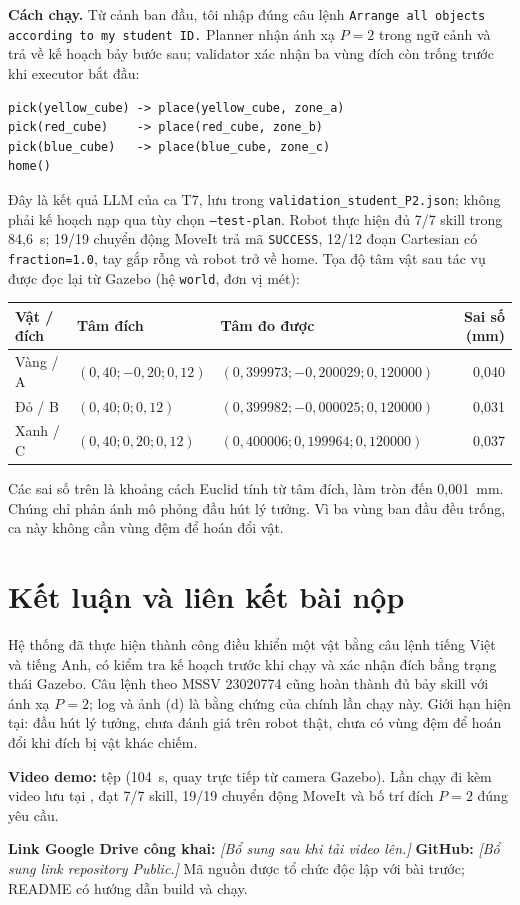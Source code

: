 \documentclass[11pt,a4paper]{article}
\begin{document}
\textbf{Cách chạy.} Từ cảnh ban đầu, tôi nhập đúng câu lệnh
\texttt{Arrange all objects according to my student ID.} Planner nhận ánh xạ
$P=2$ trong ngữ cảnh và trả về kế hoạch bảy bước sau; validator xác nhận ba
vùng đích còn trống trước khi executor bắt đầu:
\begin{lstlisting}
pick(yellow_cube) -> place(yellow_cube, zone_a)
pick(red_cube)    -> place(red_cube, zone_b)
pick(blue_cube)   -> place(blue_cube, zone_c)
home()
\end{lstlisting}
Đây là kết quả LLM của ca T7, lưu trong
\texttt{validation\_student\_P2.json}; không phải kế hoạch nạp qua tùy chọn
\texttt{--test-plan}. Robot thực hiện đủ 7/7 skill trong
84,6~s; 19/19 chuyển động MoveIt trả mã \texttt{SUCCESS}, 12/12 đoạn Cartesian
có \texttt{fraction=1.0}, tay gắp rỗng và robot trở về home. Tọa độ tâm vật
sau tác vụ được đọc lại từ Gazebo (hệ \texttt{world}, đơn vị mét):
\begin{center}\small
\begin{tabular}{@{}lllr@{}}
\toprule\textbf{Vật / đích} & \textbf{Tâm đích} & \textbf{Tâm đo được} & \textbf{Sai số (mm)}\\\midrule
Vàng / A & $(0{,}40;-0{,}20;0{,}12)$ & $(0{,}399973;-0{,}200029;0{,}120000)$ & 0,040\\
Đỏ / B & $(0{,}40;0;0{,}12)$ & $(0{,}399982;-0{,}000025;0{,}120000)$ & 0,031\\
Xanh / C & $(0{,}40;0{,}20;0{,}12)$ & $(0{,}400006;0{,}199964;0{,}120000)$ & 0,037\\
\bottomrule
\end{tabular}
\end{center}
Các sai số trên là khoảng cách Euclid tính từ tâm đích, làm tròn đến
0,001~mm. Chúng chỉ phản ánh mô phỏng đầu hút lý tưởng. Vì ba vùng ban đầu
đều trống, ca này không cần vùng đệm để hoán đổi vật.

\section{Kết luận và liên kết bài nộp}
Hệ thống đã thực hiện thành công điều khiển một vật bằng câu lệnh tiếng Việt
và tiếng Anh, có kiểm tra kế hoạch trước khi chạy và xác nhận đích bằng trạng
thái Gazebo. Câu lệnh theo MSSV 23020774 cũng hoàn thành đủ bảy skill với
ánh xạ $P=2$; log và ảnh (d) là bằng chứng của chính lần chạy này.
Giới hạn hiện tại: đầu hút lý tưởng, chưa đánh giá trên robot thật,
chưa có vùng đệm để hoán đổi khi đích bị vật khác chiếm.

\textbf{Video demo:} tệp 
(104~s, quay trực tiếp từ camera Gazebo). Lần chạy đi kèm video lưu tại
, đạt 7/7 skill, 19/19 chuyển động MoveIt
và bố trí đích $P=2$ đúng yêu cầu.\par
\textbf{Link Google Drive công khai:} \textit{[Bổ sung sau khi tải video lên.]}
\quad\textbf{GitHub:} \textit{[Bổ sung link repository Public.]}
Mã nguồn được tổ chức độc lập với bài trước; README có hướng dẫn build và chạy.
\end{document}

